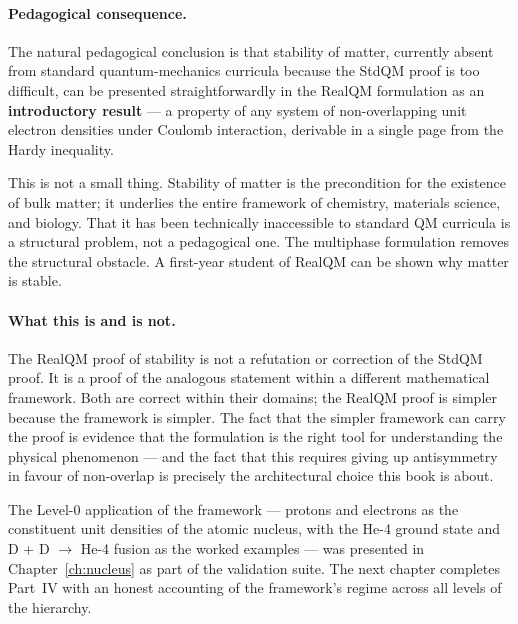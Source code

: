 \paragraph{Pedagogical consequence.}
The natural pedagogical conclusion is that stability of matter, currently absent from standard quantum-mechanics curricula because the StdQM proof is too difficult, can be presented straightforwardly in the RealQM formulation as an \textbf{introductory result} --- a property of any system of non-overlapping unit electron densities under Coulomb interaction, derivable in a single page from the Hardy inequality.

This is not a small thing. Stability of matter is the precondition for the existence of bulk matter; it underlies the entire framework of chemistry, materials science, and biology. That it has been technically inaccessible to standard QM curricula is a structural problem, not a pedagogical one. The multiphase formulation removes the structural obstacle. A first-year student of RealQM can be shown why matter is stable.

\paragraph{What this is and is not.}
The RealQM proof of stability is not a refutation or correction of the StdQM proof. It is a proof of the analogous statement within a different mathematical framework. Both are correct within their domains; the RealQM proof is simpler because the framework is simpler. The fact that the simpler framework can carry the proof is evidence that the formulation is the right tool for understanding the physical phenomenon --- and the fact that this requires giving up antisymmetry in favour of non-overlap is precisely the architectural choice this book is about.

The Level-0 application of the framework --- protons and electrons as the constituent unit densities of the atomic nucleus, with the He-4 ground state and D + D $\to$ He-4 fusion as the worked examples --- was presented in Chapter~\ref{ch:nucleus} as part of the validation suite. The next chapter completes Part~IV with an honest accounting of the framework's regime across all levels of the hierarchy.

